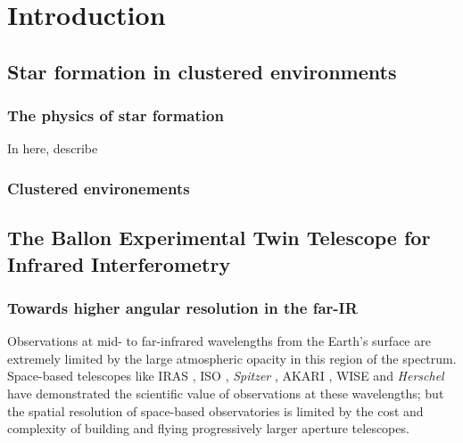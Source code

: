 
\chapter{Introduction} %

\label{chap:introduction} %



\section{Star formation in clustered environments}

\subsection{The physics of star formation}

In here, describe 

\subsection{Clustered environements}

\section{The Ballon Experimental Twin Telescope for Infrared Interferometry}

\subsection{Towards higher angular resolution in the far-IR}
Observations at mid- to far-infrared wavelengths from the Earth's surface are extremely 
limited by the large atmospheric opacity in this region of the spectrum. Space-based telescopes 
like IRAS \cite[12-100 \um;][]{1984ApJ...278L...1N}, ISO \cite[2.5-240 $\um$;][]{1996A&A...315L..27K}, \textit{Spitzer} \cite[3.6-160 $\um$;][]{2004ApJS..154....1W}, AKARI  \cite[1.7-180 $\um$;][]{2007PASJ...59S.369M}, WISE \cite[3.4-22 $\um$;][]{2010AJ....140.1868W} and \textit{Herschel} \cite[55-672 $\um$;][]{2010A&A...518L...1P} have demonstrated the scientific value of observations at 
these wavelengths; but the spatial resolution of space-based observatories is limited by the cost 
and complexity of building and flying progressively larger aperture telescopes. 

